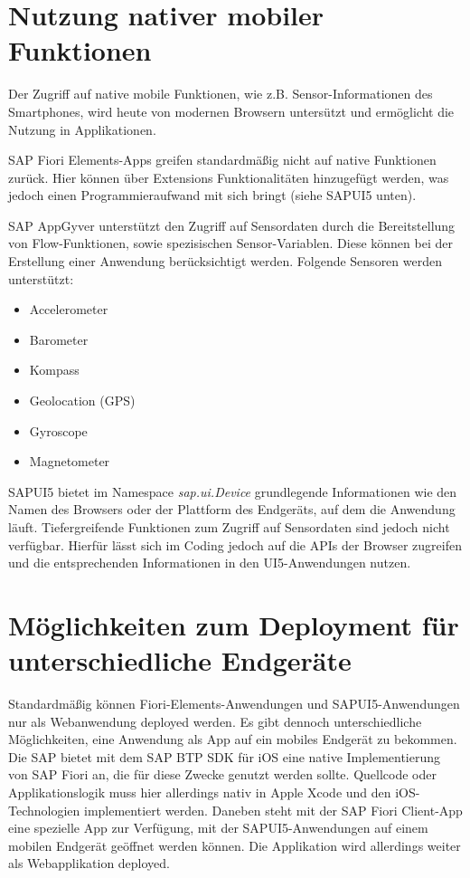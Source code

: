 \section{Nutzung nativer mobiler Funktionen}

Der Zugriff auf native mobile Funktionen, wie z.B. Sensor-Informationen des Smartphones, wird heute von modernen Browsern untersützt und ermöglicht die Nutzung in Applikationen.

SAP Fiori Elements-Apps greifen standardmäßig nicht auf native Funktionen zurück. Hier können über Extensions Funktionalitäten hinzugefügt werden, was jedoch einen Programmieraufwand mit sich bringt (siehe SAPUI5 unten).

SAP AppGyver unterstützt den Zugriff auf Sensordaten durch die Bereitstellung von Flow-Funktionen, sowie spezisischen Sensor-Variablen. Diese können bei der Erstellung einer Anwendung berücksichtigt werden. Folgende Sensoren werden unterstützt:

\begin{itemize}[noitemsep]
\item Accelerometer 
\item Barometer
\item Kompass
\item Geolocation (GPS) 
\item Gyroscope
\item Magnetometer
\end{itemize}

SAPUI5 bietet im Namespace \textit{sap.ui.Device} grundlegende Informationen wie den Namen des Browsers oder der Plattform des Endgeräts, auf dem die Anwendung läuft. Tiefergreifende Funktionen zum Zugriff auf Sensordaten sind  jedoch nicht verfügbar. Hierfür lässt sich im Coding jedoch auf die APIs der Browser zugreifen und die entsprechenden Informationen in den UI5-Anwendungen nutzen.

\section{Möglichkeiten zum Deployment für unterschiedliche Endgeräte}

Standardmäßig können Fiori-Elements-Anwendungen und SAPUI5-Anwendungen nur als Webanwendung deployed werden. Es gibt dennoch unterschiedliche Möglichkeiten, eine Anwendung als App auf ein mobiles Endgerät zu bekommen. Die SAP bietet mit dem SAP BTP SDK für iOS eine native Implementierung von SAP Fiori an, die für diese Zwecke genutzt werden sollte. Quellcode oder Applikationslogik muss hier allerdings nativ in Apple Xcode und den iOS-Technologien implementiert werden. Daneben steht mit der SAP Fiori Client-App eine spezielle App zur Verfügung, mit der SAPUI5-Anwendungen auf einem mobilen Endgerät geöffnet werden können. Die Applikation wird allerdings weiter als Webapplikation deployed.

